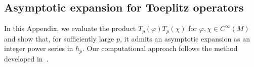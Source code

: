 \documentclass[12pt]{article}
\theoremstyle{definition} %
\theoremstyle{plain} %
\theoremstyle{remark} %
\theoremstyle{underline}
\begin{document}
\subsection{Asymptotic expansion for Toeplitz operators}
\label{asymptotic expansion}


In this Appendix, we evaluate the product $T_p(\varphi)T_p(\chi)$ for
$\varphi,\chi\in C^\infty(M)$ and show that, for sufficiently large $p$, it
admits an asymptotic expansion as an integer power series in $\hbar_p$.
Our computational approach follows the method developed in~\cite{Adachi:2022mln}.
\end{document}
